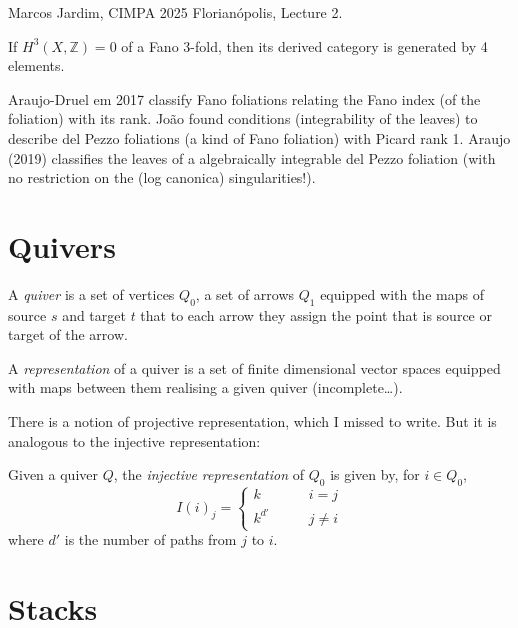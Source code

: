 \documentclass{book}
\begin{document}
\begin{remark}
\label{remark-deriv-categ-fano-3-folds}
\begin{reference}
Marcos Jardim, CIMPA 2025 Florianópolis,
Lecture 2.
\end{reference}
If $H^3(X,\mathbb{Z})=0$ of a Fano 3-fold,
then its derived category is
generated by 4 elements.
\end{remark}

\medskip\noindent
Araujo-Druel em 2017 classify
Fano foliations relating the Fano index (of
the foliation)
with its rank.
João found conditions
(integrability of the leaves)
to describe del Pezzo foliations
(a kind of Fano foliation)
with Picard rank 1.
Araujo (2019) classifies the leaves of a
algebraically integrable
del Pezzo foliation (with no restriction on
the (log
canonica) singularities!).


\section{Quivers}
\label{section-quivers}

\begin{definition}
\label{definition-quiver}
A {\it quiver} is a set of vertices $Q_0$, a
set of arrows $Q_1$ equipped with
the maps of source $s$ and target $t$ that to
each arrow they assign the point
that is source or target of the arrow.
\end{definition}

\begin{definition}
\label{definition-representation-of-quiver}
A {\it representation} of a quiver is a set
of finite dimensional vector spaces
equipped with maps between them realising a
given quiver (incomplete…).
\end{definition}

There is a notion of projective
representation, which I missed to write. But
it
is analogous to the injective representation:

\begin{definition}
\label{definition-injec-repre-quive}
Given a quiver $Q$, the {\it injective
representation} of $Q_0$ is given by, for
$i \in Q_0$,
$$
I(i)_j=\begin{cases}
k\qquad &i=j \\
k^{d'}\qquad &j \neq i
\end{cases}
$$
where $d'$ is the number of paths from $j$ to
$i$.
\end{definition}

\section{Stacks}
\label{section-stacks}
\end{document}
